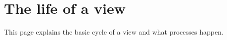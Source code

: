 \section{The life of a view}\label{view_lifetime}
This page explains the basic cycle of a view and what processes happen. 